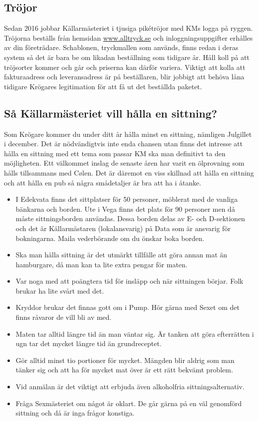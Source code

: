 \documentclass[10pt]{article}
\begin{document}
	\subsection{Tröjor}
Sedan 2016 jobbar Källarmästeriet i tjusiga pikétröjor med KMs logga på ryggen. Tröjorna beställs från hemsidan \url{www.alltryck.se} och inloggningsuppgifter erhålles av din företrädare. Schablonen, tryckmallen som används, finns redan i deras system så det är bara be om likadan beställning som tidigare år. Håll koll på att tröjsorter kommer och går och priserna kan därför variera. Viktigt att kolla att fakturaadress och leveransadress är på beställaren, blir jobbigt att behöva låna tidigare Krögares legitimation för att få ut det beställda paketet.

	\subsection{Så Källarmästeriet vill hålla en sittning?}
Som Krögare kommer du under ditt år hålla minst en sittning, nämligen Julgillet i december. Det är nödvändigtvis inte enda chansen utan finns det intresse att hålla en sittning med ett tema som passar KM ska man definitivt ta den möjligheten. Ett välkommet inslag de senaste åren har varit en ölprovning som hålls tillsammans med Cølen. Det är däremot en viss skillnad att hålla en sittning och att hålla en pub så några smådetaljer är bra att ha i åtanke.

\begin{itemize}
	\item I Edekvata finns det sittplatser för 50 personer, möblerat med de vanliga bänkarna och borden. Ute i Vega finns det plats för 90 personer men då måste sittningsborden användas. Dessa borden delas av E- och D-sektionen och det är Källarmästaren (lokalansvarig) på Data som är ansvarig för bokningarna. Maila vederbörande om du önskar boka borden.
    \item Ska man hålla sittning är det utmärkt tillfälle att göra annan mat än hamburgare, då man kan ta lite extra pengar för maten.
    \item Var noga med att poängtera tid för insläpp och när sittningen börjar. Folk brukar ha lite svårt med det.
    \item Kryddor brukar det finnas gott om i Pump. Hör gärna med Sexet om det finns råvaror de vill bli av med.
    \item Maten tar alltid längre tid än man väntar sig. Är tanken att göra efterrätten i ugn tar det mycket längre tid än grundreceptet.
    \item Gör alltid minst tio portioner för mycket. Mängden blir aldrig som man tänker sig och att ha för mycket mat över är ett rätt bekvämt problem.
    \item Vid anmälan är det viktigt att erbjuda även alkoholfria sittningsalternativ.
    \item Fråga Sexmästeriet om något är oklart. De går gärna på en väl genomförd sittning och då är inga frågor konstiga.
\end{itemize}
\end{document}
